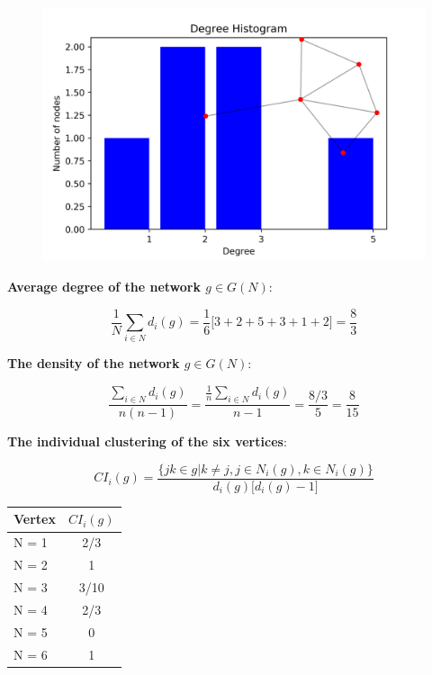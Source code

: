 \documentclass[a4paper]{article}
\begin{document}
\begin{figure}[ht!]
	\centering
		 \label{tab:figure}
		\includegraphics[scale=0.9]{degree_histogram.png}
\end{figure}



\noindent \textbf{{\color{blue} Average degree of the network $g \in G(N)$}}: 

\begin{equation}
	\frac{1}{N} \sum_{i\in N} d_i(g) = \frac{1}{6} \big[ 3 + 2 + 5 + 3 + 1 + 2 \big] = \frac{8}{3}
\end{equation}

\noindent \textbf{{\color{blue} The density of the network $g \in G(N)$}}:

\begin{equation}
	\frac{\sum_{i\in N} d_i(g)}{n(n-1)} = \frac{ \frac{1}{n} \sum_{i\in N} d_i(g) }{n-1} = \frac{8/3}{5} = \frac{8}{15}
\end{equation}

\noindent \textbf{{\color{blue} The individual clustering of the six vertices}}: 

\begin{equation}
	CI_i(g) = \frac{\Big\{ jk\in g | k \ne j, j\in N_i(g), k\in N_i(g) \Big\}}{d_i(g)\big[ d_i(g)-1\big] }
\end{equation}

\begin{table}[ht!]
	\centering
	 \label{tab:title} 
	\begin{tabular}{l@{\hskip 0.5in}c}
		Vertex & $CI_i(g)$\\
		\hline\hline
		
		N = 1 & 2/3  \\
		N = 2 &  1 \\
		N = 3 &  3/10 \\
		N = 4 & 2/3 \\
		N = 5 & 0 \\
		N = 6 & 1 \\
		
		\bottomrule[1pt]
	\end{tabular}
\end{table}
\end{document}
